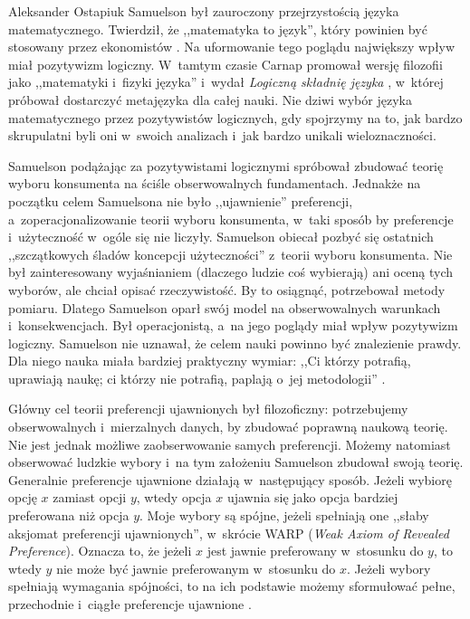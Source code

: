 \begin{artplenv}{Aleksander Ostapiuk}
Samuelson był zauroczony przejrzystością języka matematycznego. Twierdził, że ,,matematyka to język'',
który powinien być stosowany przez ekonomistów
\parencite[s.~52]{samuelson_economic_1952}.
Na uformowanie tego poglądu największy wpływ miał pozytywizm
logiczny. W~tamtym czasie Carnap promował wersję filozofii jako ,,matematyki i~fizyki języka''
\parencite[s.~180]{richardson_geometry_2003}
i~wydał \textit{Logiczną składnię języka}
\parencite{carnap_logical_1936},
w~której próbował dostarczyć metajęzyka dla całej nauki. Nie dziwi wybór
języka matematycznego przez pozytywistów logicznych, gdy spojrzymy na to, jak bardzo skrupulatni byli oni w~swoich
analizach i~jak bardzo unikali wieloznaczności.

Samuelson
\parencite*{samuelson_note_1938}
podążając za pozytywistami logicznymi spróbował zbudować teorię wyboru
konsumenta na ściśle obserwowalnych fundamentach. Jednakże na początku celem Samuelsona nie było ,,ujawnienie''
preferencji, a~zoperacjonalizowanie teorii wyboru konsumenta, w~taki sposób by 
preferencje i~użyteczność w~ogóle się nie liczyły. Samuelson obiecał pozbyć się ostatnich
,,szczątkowych śladów koncepcji użyteczności''
\parencite[s.~61]{samuelson_note_1938}
z~teorii wyboru konsumenta. Nie był zainteresowany wyjaśnianiem
(dlaczego ludzie coś wybierają) ani oceną tych wyborów, ale chciał opisać rzeczywistość. By to osiągnąć, potrzebował
metody pomiaru. Dlatego Samuelson oparł swój model na obserwowalnych warunkach i~konsekwencjach. Był
operacjonistą, a~na jego poglądy miał wpływ pozytywizm logiczny. Samuelson nie uznawał, że celem nauki
powinno być znalezienie prawdy.
Dla niego nauka miała bardziej praktyczny wymiar: ,,Ci którzy potrafią, uprawiają naukę;
ci którzy nie potrafią, paplają o~jej metodologii''
\parencite[s.~240]{samuelson_my_1992}.

Główny cel teorii preferencji ujawnionych był filozoficzny: potrzebujemy obserwowalnych i~mierzalnych danych, by
zbudować poprawną naukową teorię. Nie jest jednak możliwe zaobserwowanie samych preferencji. Możemy natomiast
obserwować ludzkie wybory i~na tym założeniu Samuelson zbudował swoją teorię. Generalnie preferencje ujawnione działają
w~następujący sposób. Jeżeli wybiorę opcję $x$ zamiast opcji $y$, wtedy opcja $x$ ujawnia się jako
opcja bardziej preferowana niż opcja $y$. Moje wybory są spójne, jeżeli spełniają one ,,słaby aksjomat preferencji
ujawnionych'', w~skrócie WARP (\textit{Weak Axiom of Revealed Preference}). Oznacza to, że jeżeli $x$ jest jawnie
preferowany w~stosunku do $y$, to wtedy $y$ nie może być jawnie preferowanym w~stosunku do $x$.
Jeżeli wybory spełniają wymagania spójności, to na ich podstawie możemy sformułować pełne, przechodnie i~ciągłe
preferencje ujawnione
\parencite{sen_choice_1971,sen_behaviour_1973}.


\end{artplenv}
